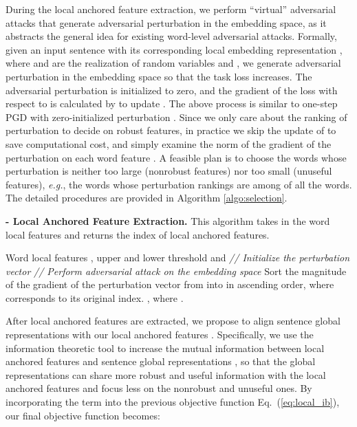 \documentclass{article} \usepackage{iclr2021_conference,times}
\theoremstyle{definition}
\theoremstyle{remark}
\newcommand{\modified}[1]{{\color{black}{#1}}}
\begin{document}
During the local anchored feature extraction, we perform ``virtual'' adversarial attacks that generate adversarial perturbation in the embedding space, as it abstracts the general idea for existing word-level adversarial attacks. Formally, given an input sentence  with its corresponding local embedding representation , where  and  are the realization of random variables  and , we generate adversarial perturbation  in the embedding space so that the task loss  increases. The adversarial perturbation  is initialized to zero, and the gradient of the loss with respect to  is calculated by  to update . The above process is similar to one-step PGD with zero-initialized perturbation . Since we only care about the ranking of perturbation to decide on robust features, in practice we skip the update of  to save computational cost, and simply examine the  norm of the gradient  of the perturbation on each word feature . A feasible plan is to choose the words whose perturbation is neither too large (nonrobust features) nor too small (unuseful features), \emph{e.g.}, the words whose perturbation rankings are among  of all the words. The detailed procedures are provided in Algorithm \ref{algo:selection}.
\begin{algorithm}[t]
\caption{\textbf{- Local Anchored Feature Extraction.} This algorithm takes in the word local features and returns the index of local anchored features.}
\label{algo:selection}
\begin{algorithmic}[1]
      Word local features , upper and lower threshold  and 
    \STATE  \quad \emph{// Initialize the perturbation vector }
    \STATE  \quad \emph{// Perform adversarial attack on the embedding space}
    \STATE Sort the magnitude of the gradient of the perturbation vector from  into  in ascending order, where  corresponds to its original index.
     , where .
\end{algorithmic}
\end{algorithm}

After local anchored features are extracted, we propose to align sentence global representations  with our local anchored features . \modified{In practice, we can use the final-layer [CLS] embedding to represent global sentence-level feature .} Specifically, we use the information theoretic tool to increase the mutual information  between local anchored features  and sentence global representations , so that the global representations can share more robust and useful information with the local anchored features and focus less on the nonrobust and unuseful ones. By incorporating the term  into the previous objective function Eq.~(\ref{eq:local_ib}), our final objective function becomes: 
\end{document}

